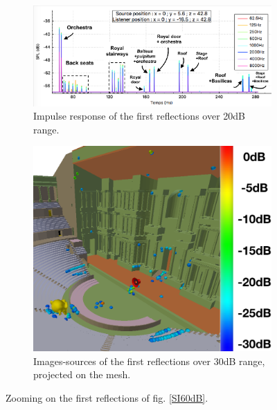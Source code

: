\documentclass[AMA,STIX1COL]{WileyNJD-v2}
\begin{document}
\begin{figure}[t]
\centering
	\begin{subfigure}{0.63\textwidth}
		\includegraphics[width=\linewidth]{rirTheatre20}
		\caption{Impulse response of the first reflections over 20dB range.}	
		\label{RIR20dB}
	\end{subfigure}
	\begin{subfigure}{0.36\textwidth}
		\includegraphics[width=\linewidth]{SI30dB}
		\caption{Images-sources of the first reflections over 30dB range, projected on the mesh.}
		\label{SI30dB}
	\end{subfigure}
	\caption{Zooming on the first reflections of fig. \ref{SI60dB}.}
	\label{SItheater}
\end{figure}
\end{document}
